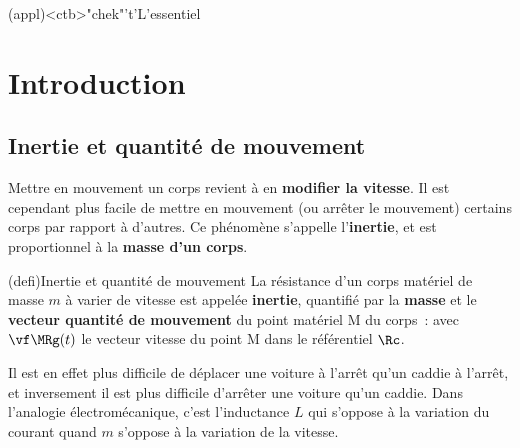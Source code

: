 \documentclass[../../main/main.tex]{subfiles}
\begin{document}
\vspace*{\fill}
\newpage
\vspace*{\fill}

\begin{tcn}[%
		sidebyside, fontupper=\small, fontlower=\small
	](appl)<ctb>"chek"'t'{L'essentiel}
	\tcblower
\end{tcn}

\vspace*{\fill}

\newpage

\section{Introduction}

\subsection{Inertie et quantité de mouvement}
Mettre en mouvement un corps revient à en \textbf{modifier la vitesse}. Il est
cependant plus facile de mettre en mouvement (ou arrêter le mouvement) certains
corps par rapport à d'autres. Ce phénomène s'appelle l'\textbf{inertie}, et est
proportionnel à la \textbf{masse d'un corps}.

\begin{tcb*}(defi){Inertie et quantité de mouvement}
	La résistance d'un corps matériel de masse $m$ à varier de vitesse est
	appelée \textbf{inertie}, quantifié par la \textbf{masse} et le
	\textbf{vecteur quantité de mouvement} du point matériel M du corps~:
	\psw{%
		\[
			\boxed{\pf\MRg(t) = m\vf\MRg(t)}
		\]
	}
	avec $\vf\MRg(t)$ le vecteur vitesse du point M dans le référentiel $\Rc$.
\end{tcb*}

Il est en effet plus difficile de déplacer une voiture à l'arrêt qu'un caddie à
l'arrêt, et inversement il est plus difficile d'arrêter une voiture qu'un
caddie. Dans l'analogie électromécanique, c'est l'inductance $L$ qui s'oppose à
la variation du courant quand $m$ s'oppose à la variation de la vitesse.
\end{document}
